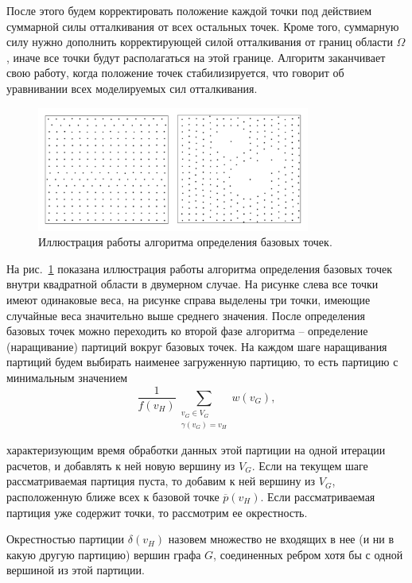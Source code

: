 После этого будем корректировать положение каждой точки под действием суммарной силы отталкивания от всех остальных точек.
Кроме того, суммарную силу нужно дополнить корректирующей силой отталкивания от границ области $\Omega$, иначе все точки будут располагаться на этой границе.
Алгоритм заканчивает свою работу, когда положение точек стабилизируется, что говорит об уравнивании всех моделируемых сил отталкивания.

\begin{figure}[ht]
\centering
\includegraphics[width=0.8\textwidth]{./pics/text_2_getero/rvp.pdf}
\singlespacing
{}\caption{Иллюстрация работы алгоритма определения базовых точек.}
\label{fig:text_2_getero_rvp}
\end{figure}

На рис.~\ref{fig:text_2_getero_rvp} показана иллюстрация работы алгоритма определения базовых точек внутри квадратной области в двумерном случае.
На рисунке слева все точки имеют одинаковые веса, на рисунке справа выделены три точки, имеющие случайные веса значительно выше среднего значения.
После определения базовых точек можно переходить ко второй фазе алгоритма -- определение (наращивание) партиций вокруг базовых точек.
На каждом шаге наращивания партиций будем выбирать наименее загруженную партицию, то есть партицию с минимальным значением
\begin{equation}
	\frac{1}{f(v_H)} \sum_{\substack{v_G \in V_G \\ \gamma(v_G) = v_H}}{w(v_G)},
\end{equation}

характеризующим время обработки данных этой партиции на одной итерации расчетов, и добавлять к ней новую вершину из $V_G$.
Если на текущем шаге рассматриваемая партиция пуста, то добавим к ней вершину из $V_G$, расположенную ближе всех к базовой точке $\overline{p}(v_H)$.
Если рассматриваемая партиция уже содержит точки, то рассмотрим ее окрестность.

\begin{definition}
Окрестностью партиции $\delta(v_H)$ назовем множество не входящих в нее (и ни в какую другую партицию) вершин графа $G$, соединенных ребром хотя бы с одной вершиной из этой партиции.
\end{definition}

